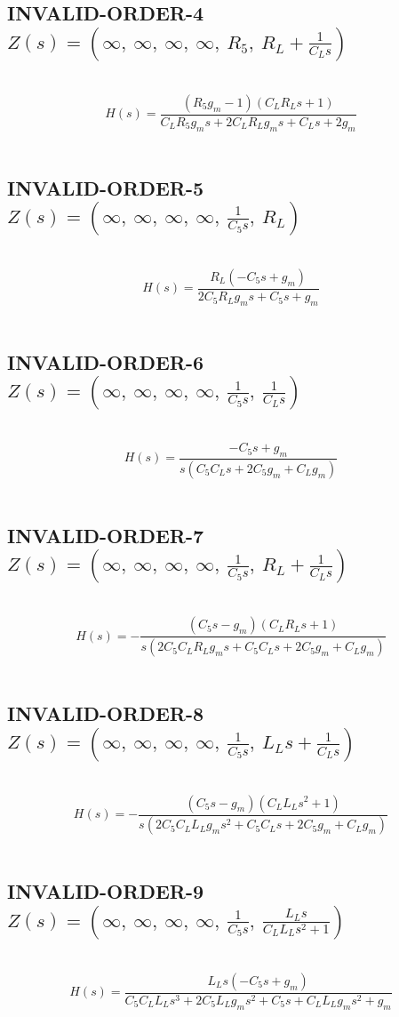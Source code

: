 \documentclass{article}
\begin{document}
\subsection{INVALID-ORDER-4 $Z(s) = \left( \infty, \  \infty, \  \infty, \  \infty, \  R_{5}, \  R_{L} + \frac{1}{C_{L} s}\right)$ } \ 
\textbf{\[H(s) = \frac{\left(R_{5} g_{m} - 1\right) \left(C_{L} R_{L} s + 1\right)}{C_{L} R_{5} g_{m} s + 2 C_{L} R_{L} g_{m} s + C_{L} s + 2 g_{m}}\] } \ 
\subsection{INVALID-ORDER-5 $Z(s) = \left( \infty, \  \infty, \  \infty, \  \infty, \  \frac{1}{C_{5} s}, \  R_{L}\right)$ } \ 
\textbf{\[H(s) = \frac{R_{L} \left(- C_{5} s + g_{m}\right)}{2 C_{5} R_{L} g_{m} s + C_{5} s + g_{m}}\] } \ 
\subsection{INVALID-ORDER-6 $Z(s) = \left( \infty, \  \infty, \  \infty, \  \infty, \  \frac{1}{C_{5} s}, \  \frac{1}{C_{L} s}\right)$ } \ 
\textbf{\[H(s) = \frac{- C_{5} s + g_{m}}{s \left(C_{5} C_{L} s + 2 C_{5} g_{m} + C_{L} g_{m}\right)}\] } \ 
\subsection{INVALID-ORDER-7 $Z(s) = \left( \infty, \  \infty, \  \infty, \  \infty, \  \frac{1}{C_{5} s}, \  R_{L} + \frac{1}{C_{L} s}\right)$ } \ 
\textbf{\[H(s) = - \frac{\left(C_{5} s - g_{m}\right) \left(C_{L} R_{L} s + 1\right)}{s \left(2 C_{5} C_{L} R_{L} g_{m} s + C_{5} C_{L} s + 2 C_{5} g_{m} + C_{L} g_{m}\right)}\] } \ 
\subsection{INVALID-ORDER-8 $Z(s) = \left( \infty, \  \infty, \  \infty, \  \infty, \  \frac{1}{C_{5} s}, \  L_{L} s + \frac{1}{C_{L} s}\right)$ } \ 
\textbf{\[H(s) = - \frac{\left(C_{5} s - g_{m}\right) \left(C_{L} L_{L} s^{2} + 1\right)}{s \left(2 C_{5} C_{L} L_{L} g_{m} s^{2} + C_{5} C_{L} s + 2 C_{5} g_{m} + C_{L} g_{m}\right)}\] } \ 
\subsection{INVALID-ORDER-9 $Z(s) = \left( \infty, \  \infty, \  \infty, \  \infty, \  \frac{1}{C_{5} s}, \  \frac{L_{L} s}{C_{L} L_{L} s^{2} + 1}\right)$ } \ 
\textbf{\[H(s) = \frac{L_{L} s \left(- C_{5} s + g_{m}\right)}{C_{5} C_{L} L_{L} s^{3} + 2 C_{5} L_{L} g_{m} s^{2} + C_{5} s + C_{L} L_{L} g_{m} s^{2} + g_{m}}\] } \ 
\end{document}
